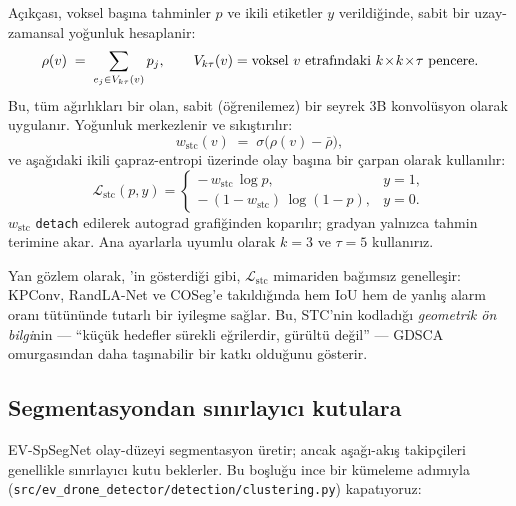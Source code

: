 \documentclass[11pt,a4paper]{article}
\begin{document}
A\c{c}{\i}k\c{c}as{\i}, voksel ba\c{s}{\i}na tahminler $p$ ve ikili
etiketler $y$ verildi\u{g}inde, sabit bir uzay-zamansal yo\u{g}unluk
hesaplanir:
\begin{equation}
    \rho(v) \;=\; \sum_{e_j \in V_{k\tau}(v)} p_j,
    \qquad V_{k\tau}(v) = \text{voksel $v$ etraf{\i}ndaki
    $k\!\times\!k\!\times\!\tau$ pencere.}
\end{equation}
Bu, t\"um a\u{g}{\i}rl{\i}klar{\i} bir olan, sabit (\"o\u{g}renilemez)
bir seyrek 3B konvol\"usyon olarak uygulan{\i}r. Yo\u{g}unluk
merkezlenir ve s{\i}k{\i}\c{s}t{\i}r{\i}l{\i}r:
\begin{equation}
    w_\text{stc}(v) \;=\; \sigma\bigl(\rho(v) - \bar{\rho}\bigr),
\end{equation}
ve a\c{s}a\u{g}{\i}daki ikili \c{c}apraz-entropi \"uzerinde olay
ba\c{s}{\i}na bir \c{c}arpan olarak kullan{\i}l{\i}r:
\begin{equation}
    \mathcal{L}_\text{stc}(p, y) =
    \begin{cases}
       -\,w_\text{stc}\,\log p,        & y = 1,\\[2pt]
       -\,(1 - w_\text{stc})\,\log(1 - p), & y = 0.
    \end{cases}
\end{equation}
$w_\text{stc}$ \texttt{detach} edilerek autograd grafi\u{g}inden
kopar{\i}l{\i}r; gradyan yaln{\i}zca tahmin terimine akar.
Ana ayarlarla uyumlu olarak $k = 3$ ve $\tau = 5$ kullan{\i}r{\i}z.

Yan g\"ozlem olarak,
\cite[Tab.~6]{chen2025evspsegnet}'in g\"osterdi\u{g}i gibi,
$\mathcal{L}_\text{stc}$ mimariden ba\u{g}{\i}ms{\i}z genelle\c{s}ir:
KPConv, RandLA-Net ve COSeg'e tak{\i}ld{\i}\u{g}{\i}nda hem IoU hem
de yanl{\i}\c{s} alarm oran{\i} t\"ut\"un\"unde tutarl{\i} bir
iyile\c{s}me sa\u{g}lar. Bu, STC'nin kodlad{\i}\u{g}{\i} \emph{geometrik
\"on bilgi}nin --- ``k\"u\c{c}\"uk hedefler s\"urekli e\u{g}rilerdir,
g\"ur\"ult\"u de\u{g}il'' --- GDSCA omurgas{\i}ndan daha
ta\c{s}{\i}nabilir bir katk{\i} oldu\u{g}unu g\"osterir.

\subsection{Segmentasyondan s{\i}n{\i}rlay{\i}c{\i} kutulara}

EV-SpSegNet olay-d\"uzeyi segmentasyon \"uretir; ancak
a\c{s}a\u{g}{\i}-ak{\i}\c{s} takip\c{c}ileri~\cite{zhang2022bytetrack}
genellikle s{\i}n{\i}rlay{\i}c{\i} kutu beklerler. Bu bo\c{s}lu\u{g}u
ince bir k\"umeleme ad{\i}m{\i}yla
(\texttt{src/ev\_drone\_detector/detection/clustering.py})
kapat{\i}yoruz:
\end{document}
